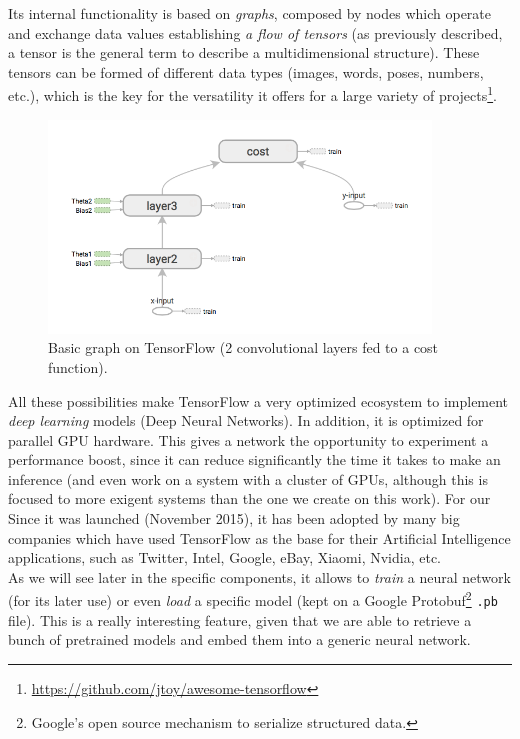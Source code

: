 	Its internal functionality is based on \emph{graphs}, composed by nodes which operate and exchange data values establishing \emph{a flow of tensors} (as previously described, a tensor is the general term to describe a multidimensional structure). These tensors can be formed of different data types (images, words, poses, numbers, etc.), which is the key for the versatility it offers for a large variety of projects\footnote{\url{https://github.com/jtoy/awesome-tensorflow}}.\\
	
	\begin{figure}[h]
		\centering
		\includegraphics[width=4in]{images/tf_graph}
		\caption{Basic graph on TensorFlow (2 convolutional layers fed to a cost function).}
		\label{fig:3_tf_graph}
	\end{figure}
	
	All these possibilities make TensorFlow a very optimized ecosystem to implement \emph{deep learning} models (Deep Neural Networks). In addition, it is optimized for parallel GPU hardware. This gives a network the opportunity to experiment a performance boost, since it can reduce significantly the time it takes to make an inference (and even work on a system with a cluster of GPUs, although this is focused to more exigent systems than the one we create on this work). For our\\
	
	Since it was launched (November 2015), it has been adopted by many big companies which have used TensorFlow as the base for their Artificial Intelligence applications, such as Twitter, Intel, Google, eBay, Xiaomi, Nvidia, etc.\\
	
	As we will see later in the specific components, it allows to \emph{train} a neural network (for its later use) or even \emph{load} a specific model (kept on a Google Protobuf\footnote{Google's open source mechanism to serialize structured data.} \texttt{.pb} file). This is a really interesting feature, given that we are able to retrieve a bunch of pretrained models and embed them into a generic neural network.

